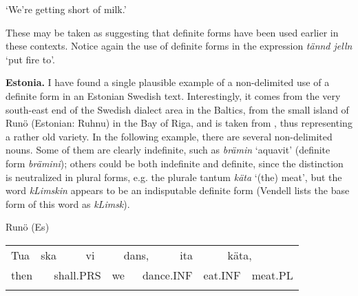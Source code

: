 \begin{styleTranslation}
‘We’re getting short of milk.’

\end{styleTranslation}

These may be taken as suggesting that definite forms have been used earlier in these contexts.  Notice again the use of definite forms in the expression \textit{tännd jelln} ‘put fire to’.

\begin{styleBodytextC}
\textbf{Estonia.} I have found a single plausible example of a non-delimited use of a definite form in an Estonian Swedish text. Interestingly, it comes from the very south-east end of the Swedish dialect area in the Baltics, from the small island of Runö (Estonian: Ruhnu) in the Bay of Riga, and is taken from \citet{Vendell1882}, thus representing a rather old variety. In the following example, there are several non-delimited nouns. Some of them are clearly indefinite, such as \textit{brämin} ‘aquavit’ (definite form \textit{brämini}); others could be both indefinite and definite, since the distinction is neutralized in plural forms, e.g. the plurale tantum \textit{käta} ‘(the) meat’, but the word \textit{kLimskin} appears to be an indisputable definite form (Vendell lists the base form of this word as \textit{kLimsk}).

\end{styleBodytextC}

\begin{listWWNumileveli}
\item {}

\begin{styleExample}
\label{bkm:Ref136427219}Runö (Es)

\end{styleExample}

\end{listWWNumileveli}

\begin{styleBodyTextFirstIndentii}

\end{styleBodyTextFirstIndentii}

\begin{tabular}{llllllllllll}
\lsptoprule
Tua & \multicolumn{2}{l}{ska

} & \multicolumn{2}{l}{vi

} & \multicolumn{2}{l}{dans,

} & \multicolumn{2}{l}{ita

} & \multicolumn{2}{l}{käta,

} & \\
\multicolumn{2}{l}{then 

} & \multicolumn{2}{l}{shall.PRS

} & \multicolumn{2}{l}{we

} & \multicolumn{2}{l}{dance.INF

} & \multicolumn{2}{l}{eat.INF

} & \multicolumn{2}{l}{meat.PL

}\\
\lspbottomrule
\end{tabular}

